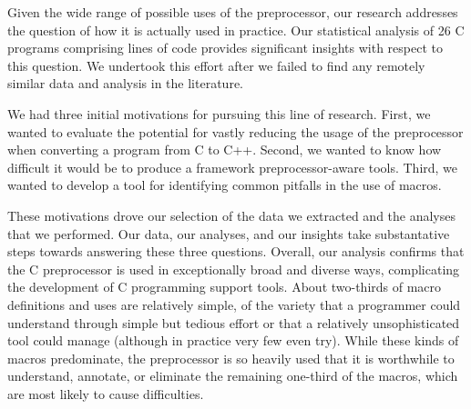 \documentclass[10pt]{article}
\def\numpackages{26}
\begin{document}
Given the wide range of possible uses of the preprocessor, our
research addresses the question of how it is actually used in
practice.  Our statistical analysis of {\numpackages} C programs
comprising {\numslinesalmost} lines of code provides significant
insights with respect to this question.  We undertook this effort
after we failed to find any remotely similar data and analysis in the
literature.

We had three initial motivations for pursuing this line of research.
First, we wanted to evaluate the potential for vastly reducing the
usage of the preprocessor when converting a program from C to C++.
Second, we wanted to know how difficult it would be to produce a
framework preprocessor-aware tools.  Third, we wanted to develop a
tool for identifying common pitfalls in the use of macros.

These motivations drove our selection of the data we extracted and the
analyses that we performed.  Our data, our analyses, and our insights
take substantative steps towards answering these three questions.
Overall, our analysis confirms that the C preprocessor is used in
exceptionally broad and diverse ways, complicating the development of
C programming support tools.  About two-thirds of macro definitions
and uses are relatively simple, of the variety that a programmer could
understand through simple but tedious effort or that a relatively
unsophisticated tool could manage (although in practice very few even
try).  While these kinds of macros predominate, the preprocessor is so
heavily used that it is worthwhile to understand, annotate, or
eliminate the remaining one-third of the macros, which are most likely
to cause difficulties.

%
%
\end{document}
